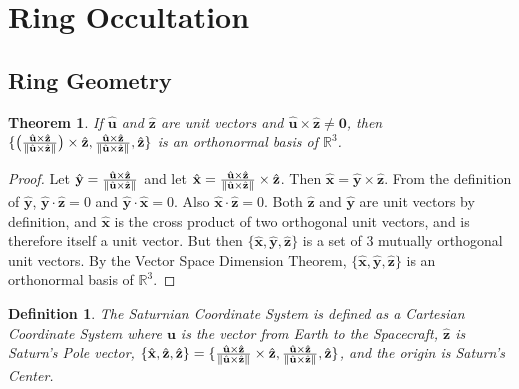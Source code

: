 \documentclass{article}
\theoremstyle{mystyle}
\newtheorem{theorem}{Theorem}[section]
\newtheorem{definition}{Definition}[section]
\begin{document}
\section{Ring Occultation}
\subsection{Ring Geometry}
\begin{theorem}
If $\hat{\mathbf{u}}$ and $\hat{\mathbf{z}}$ are unit vectors and $\hat{\mathbf{u}}\times \hat{\mathbf{z}} \ne \mathbf{0}$, then $\{\big(\frac{\hat{\mathbf{u}}\times \hat{\mathbf{z}}}{\norm{\hat{\mathbf{u}}\times \hat{\mathbf{z}}}}\big)\times \hat{\mathbf{z}},\frac{\hat{\mathbf{u}}\times \hat{\mathbf{z}}}{\norm{\hat{\mathbf{u}}\times \hat{\mathbf{z}}}},\hat{\mathbf{z}}\}$ is an orthonormal basis of $\mathbb{R}^3$.
\end{theorem}
\begin{proof}
Let $\hat{\mathbf{y}} = \frac{\hat{\mathbf{u}}\times \hat{\mathbf{z}}}{\norm{\hat{\mathbf{u}}\times \hat{\mathbf{z}}}}$ and let $\hat{\mathbf{x}} = \frac{\hat{\mathbf{u}}\times \hat{\mathbf{z}}}{\norm{\hat{\mathbf{u}}\times \hat{\mathbf{z}}}}\times \hat{\mathbf{z}}$. Then $\hat{\mathbf{x}} = \hat{\mathbf{y}}\times \hat{\mathbf{z}}$. From the definition of $\hat{\mathbf{y}}$, $\hat{\mathbf{y}}\cdot \hat{\mathbf{z}} = 0$ and $\hat{\mathbf{y}}\cdot \hat{\mathbf{x}} = 0$. Also $\hat{\mathbf{x}}\cdot \hat{\mathbf{z}} = 0$. Both $\hat{\mathbf{z}}$ and $\hat{\mathbf{y}}$ are unit vectors by definition, and $\hat{\mathbf{x}}$ is the cross product of two orthogonal unit vectors, and is therefore itself a unit vector. But then $\{\hat{\mathbf{x}},\hat{\mathbf{y}},\hat{\mathbf{z}}\}$ is a set of $3$ mutually orthogonal unit vectors. By the Vector Space Dimension Theorem, $\{\hat{\mathbf{x}},\hat{\mathbf{y}},\hat{\mathbf{z}}\}$ is an orthonormal basis of $\mathbb{R}^3$.
\end{proof}

\begin{definition}
The Saturnian Coordinate System is defined as a Cartesian Coordinate System where $\mathbf{u}$ is the vector from Earth to the Spacecraft, $\hat{\mathbf{z}}$ is Saturn's Pole vector, $\{\hat{\mathbf{x}},\hat{\mathbf{z}},\hat{\mathbf{z}}\} = \{\frac{\hat{\mathbf{u}}\times\hat{\mathbf{z}}}{\norm{\hat{\mathbf{u}}\times\hat{\mathbf{z}}}}\times\hat{\mathbf{z}},\frac{\hat{\mathbf{u}}\times\hat{\mathbf{z}}}{\norm{\hat{\mathbf{u}}\times\hat{\mathbf{z}}}},\hat{\mathbf{z}}\}$, and the origin is Saturn's Center.
\end{definition}
\end{document}
